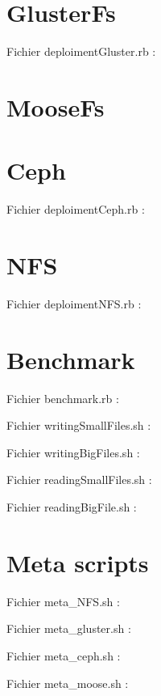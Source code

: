 \documentclass[12pt]{report}
\begin{document}
			\section{GlusterFs}
				Fichier deploimentGluster.rb :
				
			\section{MooseFs}
			\section{Ceph}
				Fichier deploimentCeph.rb :
				
			\section{NFS}
				Fichier deploimentNFS.rb :
				
\newpage
			\section{Benchmark}
				Fichier benchmark.rb :
				

				Fichier writingSmallFiles.sh :
				

				Fichier writingBigFiles.sh :
				

				Fichier readingSmallFiles.sh :
				

				Fichier readingBigFile.sh :
				
			\section{Meta scripts}
				Fichier meta\_NFS.sh :
				

				Fichier meta\_gluster.sh :
				

				Fichier meta\_ceph.sh :
				

				Fichier meta\_moose.sh :
				
\end{document}
